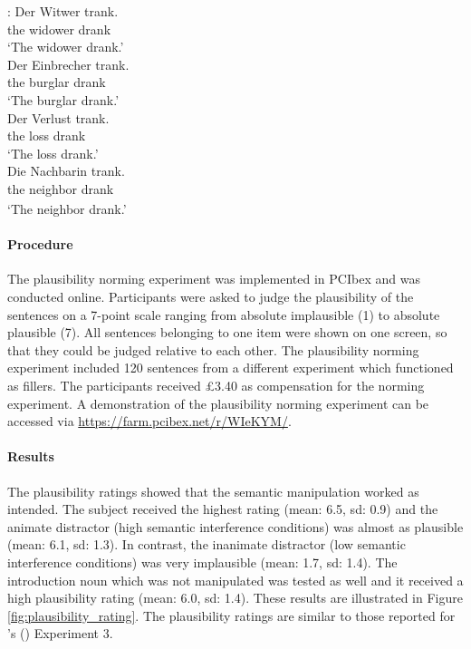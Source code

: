 \documentclass[a4paper, man, floatsintext]{apa7}
\begin{document}
\begin{exe}  
\ex \label{ex:materials_norming}
    \begin{xlist}   
    :\label{ex:subject} 
    \gll Der Witwer trank. \\ 
    the widower drank\\
    \trans  `The widower drank.'\\  
    \label{ex:animate_dist} 
    \gll Der Einbrecher trank. \\ 
    the burglar drank \\
    \trans `The burglar drank.' \\
   \label{ex:inanimate_dist} 
    \gll Der Verlust trank.  \\ 
    the loss drank\\
    \trans  `The loss drank.'\\  
    \label{ex:intro_noun} 
    \gll Die Nachbarin trank.\\ 
    the\textsubscript{} neighbor\textsubscript{} drank \\
    \trans `The neighbor drank.' \\
    \end{xlist}
\end{exe}

\paragraph{Procedure}
The plausibility norming experiment was implemented in PCIbex \citep{pcibex} and was conducted online. Participants were asked to judge the plausibility of the sentences on a 7-point scale ranging from absolute implausible (1) to absolute plausible (7). All sentences belonging to one item were shown on one screen, so that they could be judged relative to each other. The plausibility norming experiment included 120 sentences from a different experiment which functioned as fillers. The participants received \pounds 3.40 as compensation for the norming experiment. A demonstration of the plausibility norming experiment can be accessed via \hyperlink{https://farm.pcibex.net/r/WIeKYM/}{https://farm.pcibex.net/r/WIeKYM/}.

\paragraph{Results}
The plausibility ratings showed that the semantic manipulation worked as intended. The subject received the highest rating (mean: 6.5, sd: 0.9) and the animate distractor (high semantic interference conditions) was almost as plausible (mean: 6.1, sd: 1.3). In contrast, the inanimate distractor (low semantic interference conditions) was very implausible (mean: 1.7, sd: 1.4). The introduction noun which was not manipulated was tested as well and it received a high plausibility rating (mean: 6.0, sd: 1.4). These results are illustrated in Figure \ref{fig:plausibility_rating}. The plausibility ratings are similar to those reported for \citeauthor{vandyke07}'s (\citeyear{vandyke07}) Experiment 3.
\end{document}
